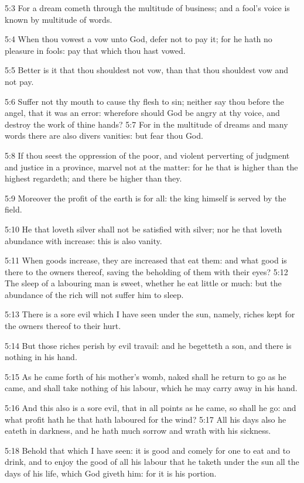 5:3 For a dream cometh through the multitude of business; and a fool's voice is known by multitude of words.

5:4 When thou vowest a vow unto God, defer not to pay it; for he hath no pleasure in fools: pay that which thou hast vowed.

5:5 Better is it that thou shouldest not vow, than that thou shouldest vow and not pay.

5:6 Suffer not thy mouth to cause thy flesh to sin; neither say thou before the angel, that it was an error: wherefore should God be angry at thy voice, and destroy the work of thine hands?  5:7 For in the multitude of dreams and many words there are also divers vanities: but fear thou God.

5:8 If thou seest the oppression of the poor, and violent perverting of judgment and justice in a province, marvel not at the matter: for he that is higher than the highest regardeth; and there be higher than they.

5:9 Moreover the profit of the earth is for all: the king himself is served by the field.

5:10 He that loveth silver shall not be satisfied with silver; nor he that loveth abundance with increase: this is also vanity.

5:11 When goods increase, they are increased that eat them: and what good is there to the owners thereof, saving the beholding of them with their eyes?  5:12 The sleep of a labouring man is sweet, whether he eat little or much: but the abundance of the rich will not suffer him to sleep.

5:13 There is a sore evil which I have seen under the sun, namely, riches kept for the owners thereof to their hurt.

5:14 But those riches perish by evil travail: and he begetteth a son, and there is nothing in his hand.

5:15 As he came forth of his mother's womb, naked shall he return to go as he came, and shall take nothing of his labour, which he may carry away in his hand.

5:16 And this also is a sore evil, that in all points as he came, so shall he go: and what profit hath he that hath laboured for the wind?  5:17 All his days also he eateth in darkness, and he hath much sorrow and wrath with his sickness.

5:18 Behold that which I have seen: it is good and comely for one to eat and to drink, and to enjoy the good of all his labour that he taketh under the sun all the days of his life, which God giveth him: for it is his portion.


